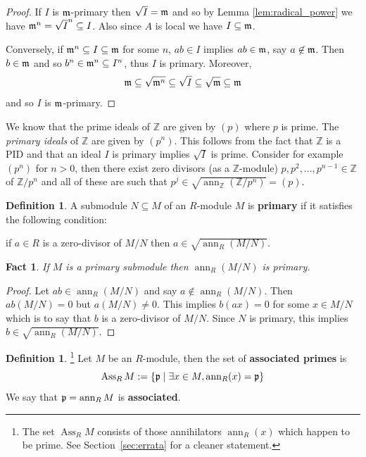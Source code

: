 \documentclass[12pt]{article}
\theoremstyle{plain}
\newtheorem{fact}[thm]{Fact}
\theoremstyle{definition}
\newtheorem{defn}[thm]{Definition} %
\newcommand{\bb}[1]{\mathbb{#1}}
\begin{document}
\begin{proof}
If $I$ is $\frak{m}$-primary then $\sqrt{I} = \frak{m}$ and so by Lemma \ref{lem:radical_power} we have $\frak{m}^n = \sqrt{I}^n \subseteq I$. Also since $A$ is local we have $I \subseteq \frak{m}$.

Conversely, if $\frak{m}^n \subseteq I \subseteq \frak{m}$ for some $n$, $ab \in I$ implies $ab \in \frak{m}$, say $a \not\in \frak{m}$. Then $b \in \frak{m}$ and so $b^n \in \frak{m}^n \subseteq I^n$, thus $I$ is primary. Moreover,
\[\frak{m} \subseteq \sqrt{\frak{m}^n} \subseteq \sqrt{I} \subseteq \sqrt{\frak{m}} \subseteq \frak{m}\]
and so $I$ is $\frak{m}$-primary.
\end{proof}
We know that the prime ideals of $\bb{Z}$ are given by $(p)$ where $p$ is prime. The \emph{primary ideals} of $\bb{Z}$ are given by $(p^n)$. This follows from the fact that $\bb{Z}$ is a PID and that an ideal $I$ is primary implies $\sqrt{I}$ is prime. Consider for example $(p^n)$ for $n > 0$, then there exist zero divisors (as a $\bb{Z}$-module) $p,p^2,...,p^{n-1} \in \bb{Z}$ of $\bb{Z}/p^n$ and all of these are such that $p^j \in \sqrt{\operatorname{ann}_\bb{Z}(\bb{Z}/p^n)} = (p)$.
\begin{defn}
A submodule $N \subseteq M$ of an $R$-module $M$ is \textbf{primary} if it satisfies the following condition:

if $a \in R$ is a zero-divisor of $M/N$ then $a \in \sqrt{\operatorname{ann}_R(M/N)}$.
\end{defn}
\begin{fact}
If $M$ is a primary submodule then $\operatorname{ann}_R(M/N)$ is primary.
\end{fact}
\begin{proof}
Let $ab \in \operatorname{ann}_R(M/N)$ and say $a \not\in \operatorname{ann}_R(M/N)$. Then $ab(M/N) = 0$ but $a(M/N) \neq 0$. This implies $b(ax) = 0$ for some $x \in M/N$ which is to say that $b$ is a zero-divisor of $M/N$. Since $N$ is primary, this implies $b \in \sqrt{\operatorname{ann}_R(M/N)}$.
\end{proof}
\begin{defn}\footnote{The set $\operatorname{Ass}_R M$ consists of those annihilators $\operatorname{ann}_R(x)$ which happen to be prime. See Section~\ref{sec:errata} for a cleaner statement.}
Let $M$ be an $R$-module, then the set of \textbf{associated primes} is \[\operatorname{Ass}_RM := \lbrace \frak{p} \mid \exists x \in M, \operatorname{ann}_R(x) = \frak{p}\rbrace\]
We say that $\frak{p} = \operatorname{ann}_RM$ is \textbf{associated}.
\end{defn}
\end{document}
